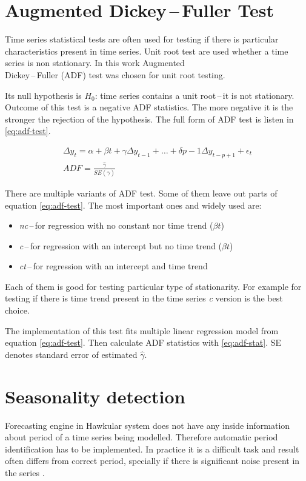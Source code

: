     \section{Augmented Dickey\,--\,Fuller Test} \label{sec:adf}
    Time series statistical tests are often used for testing if there is particular characteristics present in time
    series. Unit root test are used whether a time series is non stationary. In this work Augmented \\Dickey\,--\,Fuller
    (ADF) test was chosen for unit root testing.

    Its null hypothesis is $H_0$: time series contains a unit root\,--\,it is not stationary. Outcome of this test
    is a negative ADF statistics. The more negative it is the stronger the rejection of the hypothesis.
    The full form of ADF test is listen in \ref{eq:adf-test}.

    \begin{gather} \label{eq:adf-test}
        \Delta y_t = \alpha + \beta t + \gamma \Delta y_{t-1} + \dots + \delta{p-1} \Delta y_{t-p+1} + \epsilon_t \\
        ADF = \frac{\hat{\gamma}}{SE(\hat{\gamma})} \label{eq:adf-stat}
    \end{gather}

    There are multiple variants of ADF test. Some of them leave out parts of equation \ref{eq:adf-test}. The most
    important ones and widely used are:

    \begin{itemize}
        \item \emph{nc}\,--\,for regression with no constant nor time trend ($\beta t$)
        \item \emph{c}\,--\,for regression with an intercept but no time trend ($\beta t$)
        \item \emph{ct}\,--\,for regression with an intercept and time trend
    \end{itemize}

    Each of them is good for testing particular type of stationarity. For example for testing if there is time trend
    present in the time series \emph{c} version is the best choice.

    The implementation of this test fits multiple linear regression model from equation \ref{eq:adf-test}. Then
    calculate ADF statistics with \ref{eq:adf-stat}. SE denotes standard error of estimated $\hat{\gamma}$.

    \section{Seasonality detection} \label{sec:period-detection}
    Forecasting engine in Hawkular system does not have any inside information about period of a time series being
    modelled. Therefore automatic period identification has to be implemented. In practice it is a difficult task and
    result often differs from correct period, specially if there is significant noise present in the series
    \cite{period-meteo}.

